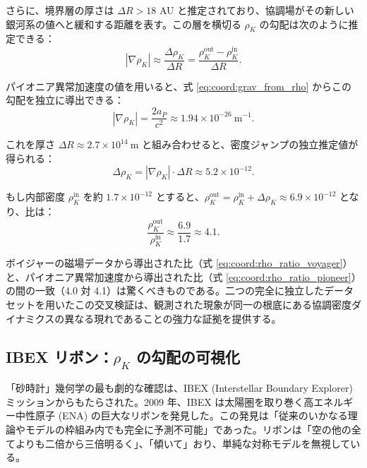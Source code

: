 \documentclass[11pt,a4paper]{article}
\theoremstyle{remark}
\begin{document}
	さらに、境界層の厚さは $\Delta R > 18$ AU と推定されており、協調場がその新しい銀河系の値へと緩和する距離を表す。この層を横切る $\rho_K$ の勾配は次のように推定できる：
	\begin{equation}
		|\nabla \rho_K| \approx \frac{\Delta \rho_K}{\Delta R} = \frac{\rho_K^{\text{out}} - \rho_K^{\text{in}}}{\Delta R}.
		\label{eq:coord:gradient_estimate}
	\end{equation}
	
	パイオニア異常加速度の値を用いると、式 \eqref{eq:coord:grav_from_rho} からこの勾配を独立に導出できる：
	\begin{equation}
		|\nabla \rho_K| = \frac{2a_P}{c^2} \approx 1.94 \times 10^{-26}\ \text{m}^{-1}.
		\label{eq:coord:gradient_pioneer}
	\end{equation}
	
	これを厚さ $\Delta R \approx 2.7 \times 10^{14}\ \text{m}$ と組み合わせると、密度ジャンプの独立推定値が得られる：
	\begin{equation}
		\Delta \rho_K = |\nabla \rho_K| \cdot \Delta R \approx 5.2 \times 10^{-12}.
		\label{eq:coord:delta_rho_pioneer}
	\end{equation}
	
	もし内部密度 $\rho_K^{\text{in}}$ を約 $1.7 \times 10^{-12}$ とすると、$\rho_K^{\text{out}} = \rho_K^{\text{in}} + \Delta \rho_K \approx 6.9 \times 10^{-12}$ となり、比は：
	\begin{equation}
		\frac{\rho_K^{\text{out}}}{\rho_K^{\text{in}}} \approx \frac{6.9}{1.7} \approx 4.1.
		\label{eq:coord:rho_ratio_pioneer}
	\end{equation}
	
	ボイジャーの磁場データから導出された比（式 \eqref{eq:coord:rho_ratio_voyager}）と、パイオニア異常加速度から導出された比（式 \eqref{eq:coord:rho_ratio_pioneer}）の間の一致（4.0 対 4.1）は驚くべきものである。二つの完全に独立したデータセットを用いたこの交叉検証は、観測された現象が同一の根底にある協調密度ダイナミクスの異なる現れであることの強力な証拠を提供する。
	
	\subsection{IBEX リボン：$\rho_K$ の勾配の可視化}
	\label{subsec:coord:ibex}
	
	「砂時計」幾何学の最も劇的な確認は、IBEX (Interstellar Boundary Explorer) ミッションからもたらされた。2009 年、IBEX は太陽圏を取り巻く高エネルギー中性原子 (ENA) の巨大なリボンを発見した。この発見は「従来のいかなる理論やモデルの枠組み内でも完全に予測不可能」であった。リボンは「空の他の全てよりも二倍から三倍明るく」、「傾いて」おり、単純な対称モデルを無視している。
	
\end{document}
